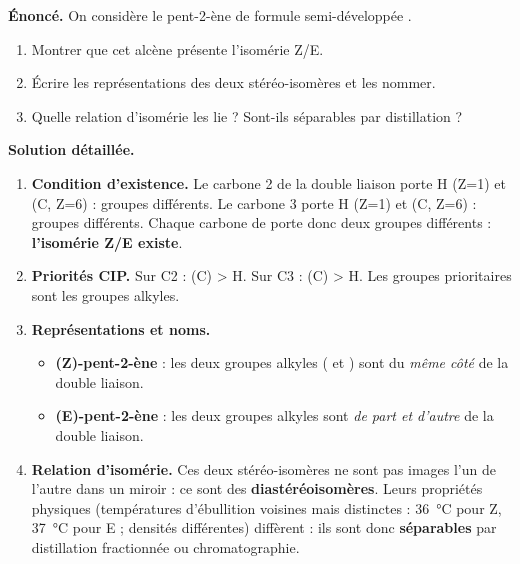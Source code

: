 \documentclass[11pt]{article}
\begin{document}
\begin{exoresolu}
\textbf{Énoncé.} On considère le pent-2-ène de formule semi-développée .
\begin{enumerate}
\item Montrer que cet alcène présente l'isomérie Z/E.
\item Écrire les représentations des deux stéréo-isomères et les nommer.
\item Quelle relation d'isomérie les lie ? Sont-ils séparables par distillation ?
\end{enumerate}
\tcblower
\textbf{Solution détaillée.}
\begin{enumerate}
\item \textbf{Condition d'existence.} Le carbone 2 de la double liaison porte H (Z=1) et  (C, Z=6) : groupes différents. Le carbone 3 porte H (Z=1) et  (C, Z=6) : groupes différents. Chaque carbone de  porte donc deux groupes différents : \textbf{l'isomérie Z/E existe}.
\item \textbf{Priorités CIP.} Sur C2 :  (C) > H. Sur C3 :  (C) > H. Les groupes prioritaires sont les groupes alkyles.
\item \textbf{Représentations et noms.}
\begin{itemize}
\item \textbf{(Z)-pent-2-ène} : les deux groupes alkyles ( et ) sont du \emph{même côté} de la double liaison.
\item \textbf{(E)-pent-2-ène} : les deux groupes alkyles sont \emph{de part et d'autre} de la double liaison.
\end{itemize}
\item \textbf{Relation d'isomérie.} Ces deux stéréo-isomères ne sont pas images l'un de l'autre dans un miroir : ce sont des \textbf{diastéréoisomères}. Leurs propriétés physiques (températures d'ébullition voisines mais distinctes : \SI{36}{\celsius} pour Z, \SI{37}{\celsius} pour E ; densités différentes) diffèrent : ils sont donc \textbf{séparables} par distillation fractionnée ou chromatographie.
\end{enumerate}
\end{exoresolu}
\end{document}
